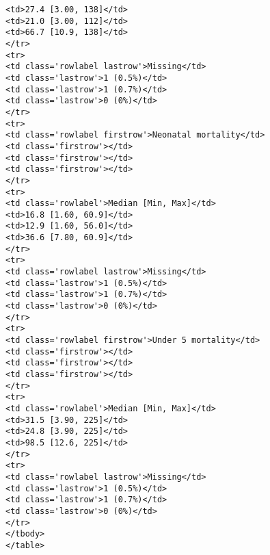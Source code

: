 \documentclass[
  letterpaper,
  DIV=11,
  numbers=noendperiod]{scrartcl}
\begin{document}
\begin{verbatim}
<td>27.4 [3.00, 138]</td>
<td>21.0 [3.00, 112]</td>
<td>66.7 [10.9, 138]</td>
</tr>
<tr>
<td class='rowlabel lastrow'>Missing</td>
<td class='lastrow'>1 (0.5%)</td>
<td class='lastrow'>1 (0.7%)</td>
<td class='lastrow'>0 (0%)</td>
</tr>
<tr>
<td class='rowlabel firstrow'>Neonatal mortality</td>
<td class='firstrow'></td>
<td class='firstrow'></td>
<td class='firstrow'></td>
</tr>
<tr>
<td class='rowlabel'>Median [Min, Max]</td>
<td>16.8 [1.60, 60.9]</td>
<td>12.9 [1.60, 56.0]</td>
<td>36.6 [7.80, 60.9]</td>
</tr>
<tr>
<td class='rowlabel lastrow'>Missing</td>
<td class='lastrow'>1 (0.5%)</td>
<td class='lastrow'>1 (0.7%)</td>
<td class='lastrow'>0 (0%)</td>
</tr>
<tr>
<td class='rowlabel firstrow'>Under 5 mortality</td>
<td class='firstrow'></td>
<td class='firstrow'></td>
<td class='firstrow'></td>
</tr>
<tr>
<td class='rowlabel'>Median [Min, Max]</td>
<td>31.5 [3.90, 225]</td>
<td>24.8 [3.90, 225]</td>
<td>98.5 [12.6, 225]</td>
</tr>
<tr>
<td class='rowlabel lastrow'>Missing</td>
<td class='lastrow'>1 (0.5%)</td>
<td class='lastrow'>1 (0.7%)</td>
<td class='lastrow'>0 (0%)</td>
</tr>
</tbody>
</table>
\end{verbatim}
\end{document}
